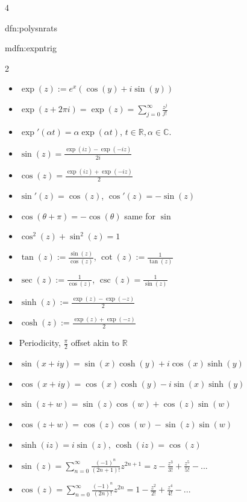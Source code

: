 \documentclass[landscape, 8pt]{extarticle}
\begin{document}
\begin{multicols*}{4}
\begin{dfn}{dfn:polysnrats}{ }
		\end{dfn}
		
		
		\begin{mdfn}{mdfn:expntrig}{ }
			\vspace{-5pt}
			\begin{multicols}{2}
				\begin{itemize}
					\item $\exp(z) := e^x(\cos(y) + i\sin(y))$
					\item $\exp(z + 2 \pi i) = \exp(z) = \sum_{j=0}^{\infty} \frac{z^j}{j!}$
					\item $\exp'(\alpha t) = \alpha \exp(\alpha t)$, $t\in \mathbb{R}, \alpha\in \mathbb{C}$.
					\item $\sin(z) = \frac{\exp(iz) - \exp(-iz)}{2i}$
					\item $\cos(z) = \frac{\exp(iz) + \exp(-iz)}{2}$
					\item $\sin'(z) = \cos(z)$, $\cos'(z) = -\sin(z)$
					\item $\cos(\theta + \pi) = -\cos(\theta)$ same for $\sin$
				\end{itemize}
				
				\columnbreak
				
				\begin{itemize}
					\item $\cos^2(z) + \sin^2(z) = 1$
					\item $\tan(z) := \frac{\sin(z)}{\cos(z)}$, $\cot(z):= \frac{1}{\tan(z)}$ 
					\item $\sec(z) := \frac{1}{\cos(z)}$, $\csc(z) = \frac{1}{\sin(z)}$
					\item $\sinh(z) := \frac{\exp(z) - \exp(-z)}{2}$
					\item $\cosh(z) := \frac{\exp(z) + \exp(-z)}{2}$
					\item Periodicity, $\frac{\pi}{2}$ offset akin to $\mathbb{R}$
				\end{itemize}
				
			\end{multicols}
			
			\vspace{-8pt}
			
			\begin{itemize}
				\item $\sin(x + iy) = \sin(x)\cosh(y) + i\cos(x)\sinh(y)$
				\item $\cos(x+iy) = \cos(x)\cosh(y) - i\sin(x)\sinh(y)$
				\item $\sin(z+w) = \sin(z)\cos(w) + \cos(z)\sin(w)$
				\item $\cos(z+w) = \cos(z)\cos(w) - \sin(z)\sin(w)$
				\item $\sinh(iz) = i\sin(z)$, $\cosh(iz) = \cos(z)$
				\item $\sin(z) = \sum_{n=0}^{\infty} \frac{(-1)^n}{(2n+1)!}z^{2n+1} = z-\frac{z^3}{3!} + \frac{z^5}{5!} - ...$
				\item $\cos(z) = \sum_{n=0}^{\infty} \frac{(-1)^n}{(2n)!}z^{2n} = 1 - \frac{z^2}{2!} + \frac{z^4}{4!} - ...$
			\end{itemize}
			

\end{mdfn}
\end{multicols*}
\end{document}

